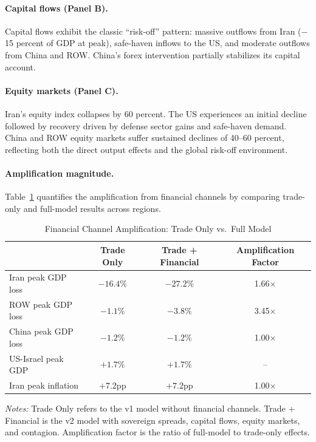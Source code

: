 \documentclass[12pt]{article}
\begin{document}
\paragraph{Capital flows (Panel B).} Capital flows exhibit the classic ``risk-off'' pattern: massive outflows from Iran ($-$15 percent of GDP at peak), safe-haven inflows to the US, and moderate outflows from China and ROW. China's forex intervention partially stabilizes its capital account.

\paragraph{Equity markets (Panel C).} Iran's equity index collapses by 60 percent. The US experiences an initial decline followed by recovery driven by defense sector gains and safe-haven demand. China and ROW equity markets suffer sustained declines of 40--60 percent, reflecting both the direct output effects and the global risk-off environment.

\paragraph{Amplification magnitude.} Table~\ref{tab:amplification} quantifies the amplification from financial channels by comparing trade-only and full-model results across regions.

\begin{table}[H]
\centering
\small
\begin{threeparttable}
\caption{Financial Channel Amplification: Trade Only vs.\ Full Model}
\label{tab:amplification}
\begin{tabular}{@{}lccc@{}}
\toprule
& Trade Only & Trade + Financial & Amplification Factor \\
\midrule
Iran peak GDP loss & $-16.4\%$ & $-27.2\%$ & 1.66$\times$ \\
ROW peak GDP loss & $-1.1\%$ & $-3.8\%$ & 3.45$\times$ \\
China peak GDP loss & $-1.2\%$ & $-1.2\%$ & 1.00$\times$ \\
US-Israel peak GDP & $+1.7\%$ & $+1.7\%$ & -- \\
Iran peak inflation & $+7.2$pp & $+7.2$pp & 1.00$\times$ \\
\bottomrule
\end{tabular}
\begin{tablenotes}[flushleft]
\small
\item \textit{Notes:} Trade Only refers to the v1 model without financial channels. Trade + Financial is the v2 model with sovereign spreads, capital flows, equity markets, and contagion. Amplification factor is the ratio of full-model to trade-only effects.
\end{tablenotes}
\end{threeparttable}
\end{table}
\end{document}

